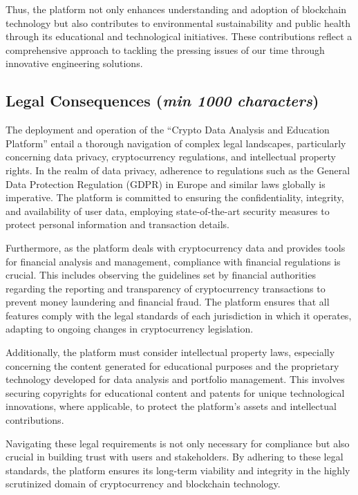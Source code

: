 \documentclass[12pt]{report}
\newcommand{\characters}[1]{(\textit{min #1 characters})}
\begin{document}
Thus, the platform not only enhances understanding and adoption of blockchain technology but also contributes to environmental sustainability and public health through its educational and technological initiatives. These contributions reflect a comprehensive approach to tackling the pressing issues of our time through innovative engineering solutions.

\subsection{Legal Consequences \characters{1000}}
The deployment and operation of the ``Crypto Data Analysis and Education Platform'' entail a thorough navigation of complex legal landscapes, particularly concerning data privacy, cryptocurrency regulations, and intellectual property rights. In the realm of data privacy, adherence to regulations such as the General Data Protection Regulation (GDPR) in Europe and similar laws globally is imperative. The platform is committed to ensuring the confidentiality, integrity, and availability of user data, employing state-of-the-art security measures to protect personal information and transaction details.

Furthermore, as the platform deals with cryptocurrency data and provides tools for financial analysis and management, compliance with financial regulations is crucial. This includes observing the guidelines set by financial authorities regarding the reporting and transparency of cryptocurrency transactions to prevent money laundering and financial fraud. The platform ensures that all features comply with the legal standards of each jurisdiction in which it operates, adapting to ongoing changes in cryptocurrency legislation.

Additionally, the platform must consider intellectual property laws, especially concerning the content generated for educational purposes and the proprietary technology developed for data analysis and portfolio management. This involves securing copyrights for educational content and patents for unique technological innovations, where applicable, to protect the platform’s assets and intellectual contributions.

Navigating these legal requirements is not only necessary for compliance but also crucial in building trust with users and stakeholders. By adhering to these legal standards, the platform ensures its long-term viability and integrity in the highly scrutinized domain of cryptocurrency and blockchain technology.
\end{document}
